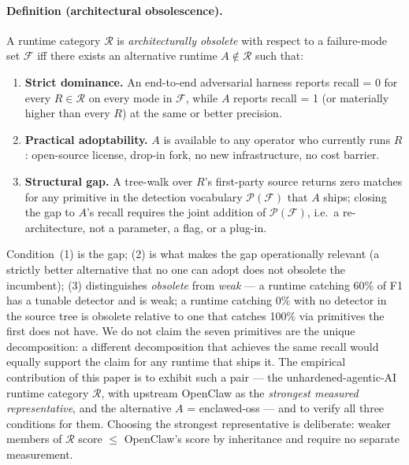 \documentclass[11pt]{article}
\begin{document}
\paragraph{Definition (architectural obsolescence).}
\label{sec:def-obsolescence}
A runtime category $\mathcal{R}$ is \emph{architecturally obsolete}
with respect to a failure-mode set $\mathcal{F}$ iff there exists
an alternative runtime $A \notin \mathcal{R}$ such that:
\begin{enumerate}
  \item \textbf{Strict dominance.} An end-to-end adversarial
    harness reports recall = 0 for every $R \in \mathcal{R}$ on
    every mode in $\mathcal{F}$, while $A$ reports recall = 1 (or
    materially higher than every $R$) at the same or better
    precision.
  \item \textbf{Practical adoptability.} $A$ is available to any
    operator who currently runs $R$: open-source license,
    drop-in fork, no new infrastructure, no cost barrier.
  \item \textbf{Structural gap.} A tree-walk over $R$'s first-party
    source returns zero matches for any primitive in the detection
    vocabulary $\mathcal{P}(\mathcal{F})$ that $A$ ships; closing
    the gap to $A$'s recall requires the joint addition of
    $\mathcal{P}(\mathcal{F})$, i.e.\ a re-architecture, not a
    parameter, a flag, or a plug-in.
\end{enumerate}
Condition~(1) is the gap; (2) is what makes the gap operationally
relevant (a strictly better alternative that no one can adopt does
not obsolete the incumbent); (3) distinguishes \emph{obsolete} from
\emph{weak} --- a runtime catching 60\% of F1 has a tunable detector
and is weak; a runtime catching 0\% with no detector in the source
tree is obsolete relative to one that catches 100\% via primitives
the first does not have. We do not claim the seven primitives are
the unique decomposition: a different decomposition that achieves
the same recall would equally support the claim for any runtime
that ships it. The empirical contribution of this paper is to
exhibit such a pair --- the unhardened-agentic-AI runtime category
$\mathcal{R}$, with upstream OpenClaw as the \emph{strongest
measured representative}, and the alternative $A$ = enclawed-oss
--- and to verify all three conditions for them. Choosing the
strongest representative is deliberate: weaker members of
$\mathcal{R}$ score $\leq$ OpenClaw's score by inheritance and
require no separate measurement.
\end{document}
